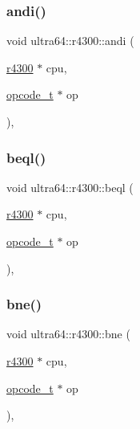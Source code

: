 \mbox{\label{classultra64_1_1r4300_aafd958f51c826972123b0f8ee9b3304f}} 
\subsubsection{\texorpdfstring{andi()}{andi()}}
{\footnotesize\ttfamily void ultra64\+::r4300\+::andi (\begin{DoxyParamCaption}\item[{\hyperlink{classultra64_1_1r4300}{r4300} $\ast$}]{cpu,  }\item[{\hyperlink{classultra64_1_1opcode__t}{opcode\+\_\+t} $\ast$}]{op }\end{DoxyParamCaption})\hspace{0.3cm}{\ttfamily [static]}, {\ttfamily [private]}}

\mbox{\label{classultra64_1_1r4300_a4cac0b74f108aba37a9d490ea108e462}} 
\subsubsection{\texorpdfstring{beql()}{beql()}}
{\footnotesize\ttfamily void ultra64\+::r4300\+::beql (\begin{DoxyParamCaption}\item[{\hyperlink{classultra64_1_1r4300}{r4300} $\ast$}]{cpu,  }\item[{\hyperlink{classultra64_1_1opcode__t}{opcode\+\_\+t} $\ast$}]{op }\end{DoxyParamCaption})\hspace{0.3cm}{\ttfamily [static]}, {\ttfamily [private]}}

\mbox{\label{classultra64_1_1r4300_a42488331ec6ffe52b90a8b3c799a3e7a}} 
\subsubsection{\texorpdfstring{bne()}{bne()}}
{\footnotesize\ttfamily void ultra64\+::r4300\+::bne (\begin{DoxyParamCaption}\item[{\hyperlink{classultra64_1_1r4300}{r4300} $\ast$}]{cpu,  }\item[{\hyperlink{classultra64_1_1opcode__t}{opcode\+\_\+t} $\ast$}]{op }\end{DoxyParamCaption})\hspace{0.3cm}{\ttfamily [static]}, {\ttfamily [private]}}

